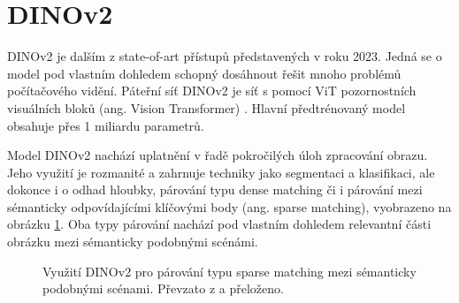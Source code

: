 \section{DINOv2}
\label{sec:Chapter27}

DINOv2 je dalším z state-of-art přístupů představených v \cite{dinov2} roku 2023. Jedná se o model pod vlastním dohledem schopný dosáhnout řešit mnoho problémů počítačového vidění. Páteřní síť DINOv2 je síť s pomocí ViT pozornostních visuálních bloků (ang. Vision Transformer) \cite{vit}. Hlavní předtrénovaný model obsahuje přes 1 miliardu parametrů.

Model DINOv2 nachází uplatnění v řadě pokročilých úloh zpracování obrazu. Jeho využití je rozmanité a zahrnuje techniky jako segmentaci a klasifikaci, ale dokonce i o odhad hloubky, párování typu dense matching či i párování mezi sémanticky odpovídajícími klíčovými body (ang. sparse matching), vyobrazeno na obrázku \ref{fig:dinov2_sparse_matching}. Oba typy párování nachází pod vlastním dohledem relevantní části obrázku mezi sémanticky podobnými scénámi. \cite{dinov2.metademolab.com}

\begin{figure}[H]
\centering

\newcommand{\subfiguresize}{.15\textwidth}
\newcommand{\imagewidth}{1.0in}
\newcommand{\hspacesize}{.43in}

\newcommand{\insertimage}[1]{%
  \begin{minipage}{\imagewidth}
    \centering
    \texttt{[image: \#1]}
  \end{minipage}
}

\hspace{\hspacesize}%

\caption[Využití DINOv2 pro párování typu sparse matching]
{Využití DINOv2 pro párování typu sparse matching mezi sémanticky podobnými scénami. Převzato z \cite{dinov2} a přeloženo.}
\label{fig:dinov2_sparse_matching}
\end{figure}

\endinput